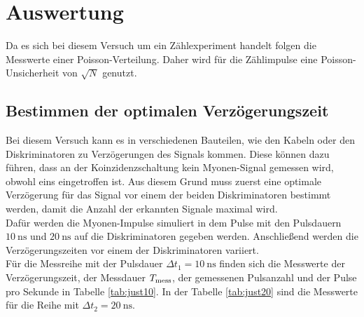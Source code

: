 \newpage 
\section{Auswertung}

\noindent
Da es sich bei diesem Versuch um ein Zählexperiment handelt folgen die Messwerte einer Poisson-Verteilung. 
Daher wird für die Zählimpulse eine Poisson-Unsicherheit von $\sqrt{N}$ genutzt.

\subsection{Bestimmen der optimalen Verzögerungszeit}

\noindent
Bei diesem Versuch kann es in verschiedenen Bauteilen, wie den Kabeln oder den Diskriminatoren zu Verzögerungen des Signals kommen.
Diese können dazu führen, dass an der Koinzidenzschaltung kein Myonen-Signal gemessen wird, obwohl eins eingetroffen ist.
Aus diesem Grund muss zuerst eine optimale Verzögerung für das Signal vor einem der beiden Diskriminatoren bestimmt werden, 
damit die Anzahl der erkannten Signale maximal wird.\\
Dafür werden die Myonen-Impulse simuliert in dem Pulse mit den Pulsdauern $\SI{10}{\nano\second}$ und $\SI{20}{\nano\second}$ auf die Diskriminatoren gegeben werden.
Anschließend werden die Verzögerungszeiten vor einem der Diskriminatoren variiert. \\
Für die Messreihe mit der Pulsdauer $ \Delta t_1 = \SI{10}{\nano\second}$ finden sich die Messwerte der Verzögerungszeit, der Messdauer $T_{\text{mess}}$, der gemessenen Pulsanzahl und der Pulse pro Sekunde in Tabelle \ref{tab:just10}.
In der Tabelle \ref{tab:just20} sind die Messwerte für die Reihe mit $ \Delta t_2 =\SI{20}{\nano\second}$.


